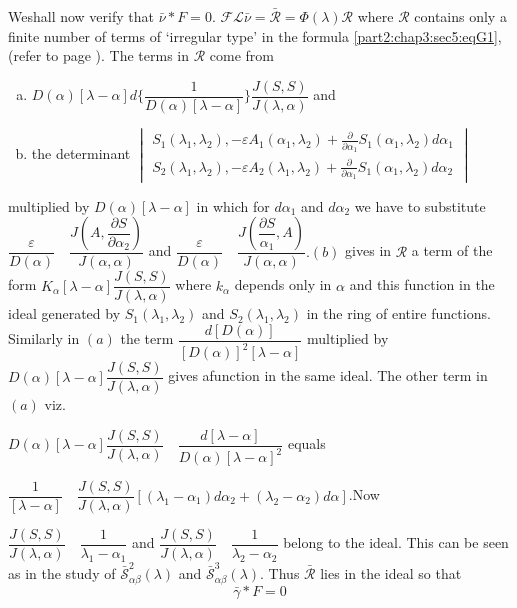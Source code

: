 We\pageoriginale shall now verify that $\bar{\nu} * F =0$. $\mathscr{F} \mathcal{L}
\bar{\nu} = \bar{\mathcal{R}} = \Phi (\lambda) \mathcal{R}$ where
$\mathcal{R}$ contains only a finite number of terms of `irregular
type' in the formula \ref{part2:chap3:sec5:eqG1}, (refer to page
\pageref{page100}). The terms in $\mathcal{R}$ come from 
\begin{enumerate}[a)]
\item $D(\alpha) [\lambda -\alpha] d \bigg\{ \dfrac{1}{D (\alpha)
  [\lambda -\alpha]}\bigg\} \dfrac{J (S,S)} {J (\lambda, \alpha)}$ and 
\item the determinant  $\begin{vmatrix}  S_1 (\lambda_1, \lambda_2),
  - \varepsilon A_1 (\alpha_1, \lambda_2) + \frac{\partial}{\partial
    \alpha_1} S_1 (\alpha_1, \lambda_2) d \alpha_1\\               S_2
  (\lambda_1, \lambda_2),  - \varepsilon A_2 (\lambda_1, \lambda_2) +
  \frac{\partial}{\partial \alpha_1} S_1 (\alpha_1, \lambda_2) d
  \alpha_2 \end{vmatrix}$ 
\end{enumerate}
multiplied by $D (\alpha) [\lambda- \alpha]$ in which for $d
\alpha_1$ and $d \alpha_2$ we have to substitute $\dfrac{\varepsilon}{
  D(\alpha)} \quad \dfrac{J \left(A, \dfrac{\partial S} {\partial
    \alpha_2}\right)}{J (\alpha, \alpha)}$ and $\dfrac {\varepsilon} {D
  (\alpha)} \quad \dfrac{J \left(\dfrac{\partial S} {\alpha_1},A \right)}{J
  (\alpha, \alpha)}. (b)$ gives in $\mathscr{R}$ a term of the form
$K_\alpha [\lambda -\alpha] \dfrac {J (S,S)} {J (\lambda, \alpha)}$
where $k_\alpha$ depends only in $\alpha$ and this function in the
ideal generated by $S_1 (\lambda_1, \lambda_2)$ and $S_2 (\lambda_1,
\lambda_2)$ in the ring of entire functions. Similarly in $(a)$ the
term $\dfrac {d [D (\alpha)]} {[D (\alpha)]^2 [\lambda-\alpha]}$
multiplied by $D (\alpha) [\lambda -\alpha] \dfrac {J (S,S)} {J
  (\lambda, \alpha)}$ gives a\pageoriginale function in the same ideal. The other
term in $(a)$ viz.  

$D (\alpha) [\lambda -\alpha] \dfrac{J(S,S)} {J (\lambda, \alpha)}
\quad \dfrac{d [\lambda -\alpha]}{ D (\alpha) [\lambda -\alpha]^2}$
equals  

$\dfrac{1}{[\lambda- \alpha]} \quad \dfrac{J (S,S)} {J (\lambda,
  \alpha)} \left[ (\lambda_1 -\alpha_1) d \alpha_2 + (\lambda_2
  -\alpha_2) d \alpha\right]$.Now  

$\dfrac{J (S,S)}{ J (\lambda, \alpha)} \quad \dfrac{1}{\lambda_1 -
  \alpha_1}$ and $\dfrac{J (S,S)}{J (\lambda, \alpha)} \quad
\dfrac{1}{\lambda_2 -\alpha_2}$ belong to the ideal. This can be seen
as in the study of $\bar{\mathscr{S}}^2_{\alpha \beta} (\lambda)$ and
$\bar{\mathscr{S}}^3_{\alpha \beta} (\lambda)$. Thus
$\bar{\mathcal{R}}$ lies in the ideal so that 
$$
\bar{\gamma} * F = 0
$$

